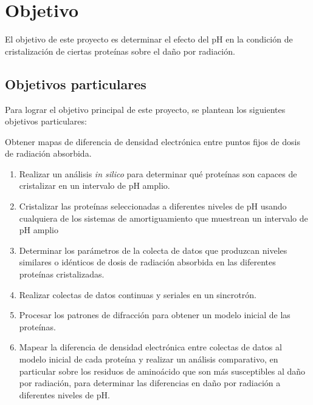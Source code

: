 \chapter{Objetivo}

El objetivo de este proyecto es determinar el efecto del pH en la condición de cristalización de ciertas proteínas sobre el daño por radiación. 
\section{Objetivos particulares}
Para lograr el objetivo principal de este proyecto, se plantean los siguientes objetivos particulares:

Obtener mapas de diferencia de densidad electrónica entre puntos fijos de dosis de radiación absorbida.

\begin{enumerate}
	\item Realizar un análisis \emph{in silico} para determinar qué proteínas son capaces de cristalizar en un intervalo de pH amplio.
	\item Cristalizar las proteínas seleccionadas a diferentes niveles de pH usando cualquiera de los sistemas de amortiguamiento que muestrean un intervalo de pH amplio
	\item Determinar los parámetros de la colecta de datos que produzcan niveles similares o idénticos de dosis de radiación absorbida en las diferentes proteínas cristalizadas.
	\item Realizar colectas de datos continuas y seriales en un sincrotrón.
	\item Procesar los patrones de difracción para obtener un modelo inicial de las proteínas.
	\item Mapear la diferencia de densidad electrónica entre colectas de datos al modelo inicial de cada proteína y realizar un análisis comparativo, en particular sobre los residuos de aminoácido que son más susceptibles al daño por radiación, para determinar las diferencias en daño por radiación a diferentes niveles de pH.
\end{enumerate}	